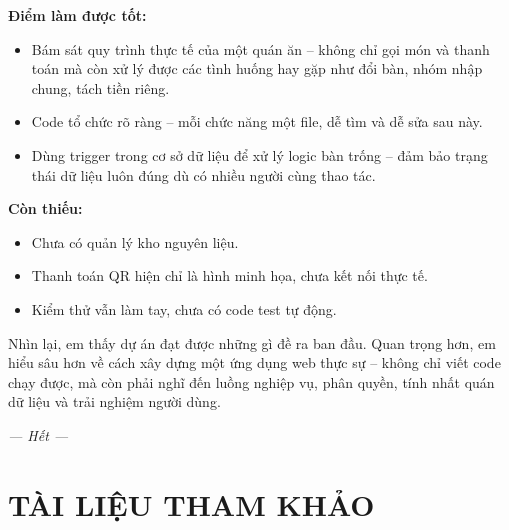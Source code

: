 \documentclass[12pt,a4paper]{report}
\begin{document}
\textbf{Điểm làm được tốt:}
\begin{itemize}
  \item Bám sát quy trình thực tế của một quán ăn -- không chỉ gọi món và thanh toán mà còn xử lý được các tình huống hay gặp như đổi bàn, nhóm nhập chung, tách tiền riêng.
  \item Code tổ chức rõ ràng -- mỗi chức năng một file, dễ tìm và dễ sửa sau này.
  \item Dùng trigger trong cơ sở dữ liệu để xử lý logic bàn trống -- đảm bảo trạng thái dữ liệu luôn đúng dù có nhiều người cùng thao tác.
\end{itemize}

\textbf{Còn thiếu:}
\begin{itemize}
  \item Chưa có quản lý kho nguyên liệu.
  \item Thanh toán QR hiện chỉ là hình minh họa, chưa kết nối thực tế.
  \item Kiểm thử vẫn làm tay, chưa có code test tự động.
\end{itemize}

Nhìn lại, em thấy dự án đạt được những gì đề ra ban đầu. Quan trọng hơn, em hiểu sâu hơn về cách xây dựng một ứng dụng web thực sự -- không chỉ viết code chạy được, mà còn phải nghĩ đến luồng nghiệp vụ, phân quyền, tính nhất quán dữ liệu và trải nghiệm người dùng.

\vspace{1.5cm}
\begin{center}
  \textit{--- Hết ---}
\end{center}

\chapter*{TÀI LIỆU THAM KHẢO}
\end{document}
